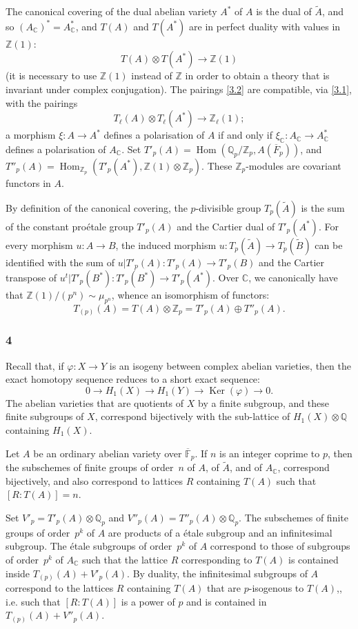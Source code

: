\documentclass{article}
\newcommand{\FF}{\mathbb{F}}
\newcommand{\ZZ}{\mathbb{Z}}
\newcommand{\QQ}{\mathbb{Q}}
\newcommand{\CC}{\mathbb{C}}
\DeclareMathOperator{\Hom}{Hom}
\DeclareMathOperator{\Ker}{Ker}
\newcommand{\oldpage}[1]{\marginpar{\footnotesize$\Big\vert$ \textit{p.~#1}}}
\begin{document}
The canonical covering of the dual abelian variety $A^*$ of $A$ is the dual of $\widetilde{A}$, and so $(A_\CC)^*=A_\CC^*$, and $T(A)$ and $T(A^*)$ are in perfect duality with values in $\ZZ(1)$:
\[
\label{3.2}
  T(A)\otimes T(A^*) \to \ZZ(1)
\tag{3.2}
\]
(it is necessary to use $\ZZ(1)$ instead of $\ZZ$ in order to obtain a theory that is invariant under complex conjugation).
The pairings \cref{3.2} are compatible, via \cref{3.1}, with the pairings
\[
  T_\ell(A)\otimes T_\ell(A^*) \to \ZZ_\ell(1);
\]
a morphism $\xi\colon A\to A^*$ defines a polarisation of $A$ if and only if $\xi_\CC\colon A_\CC\to A_\CC^*$ defines a polarisation of $A_\CC$.
Set $T'_p(A) = \Hom(\QQ_p/\ZZ_p,A(\overline{F}_p))$, and $T''_p(A) = \Hom_{\ZZ_p}(T'_p(A^*),\ZZ(1)\otimes\ZZ_p)$.
These $\ZZ_p$-modules are covariant functors in $A$.

By definition of the canonical covering, the $p$-divisible group $T_p(\widetilde{A})$ is the sum of the constant pro\'{e}tale group $T'_p(A)$ and the Cartier dual of $T'_p(A^*)$.
For every morphism $u\colon A\to B$, the induced morphism $u\colon T_p(\widetilde{A})\to T_p(\widetilde{B})$ can be identified with the sum of $u|T'_p(A)\colon T'_p(A)\to T'_p(B)$ and the Cartier transpose of $u^t|T'_p(B^*)\colon T'_p(B^*)\to T'_p(A^*)$.
Over $\CC$, we canonically have that $\ZZ(1)/(p^n)\sim\mu_{p^n}$, whence an isomorphism of functors:
\[
\label{3.3}
  T_{(p)}(A) = T(A)\otimes\ZZ_p = T'_p(A)\oplus T''_p(A).
\tag{3.3}
\]


\subsubsection*{4}
\label{4}
Recall that, if $\varphi\colon X\to Y$ is an isogeny between complex abelian varieties, then the exact homotopy sequence reduces to a short exact sequence:
\[
  0 \to H_1(X) \to H_1(Y) \to \Ker(\varphi) \to 0.
\]
\oldpage{240}
The abelian varieties that are quotients of $X$ by a finite subgroup, and these finite subgroups of $X$, correspond bijectively with the sub-lattice of $H_1(X)\otimes\QQ$ containing $H_1(X)$.

Let $A$ be an ordinary abelian variety over $\overline{\FF}_p$.
If $n$ is an integer coprime to $p$, then the subschemes of finite groups of order~$n$ of $A$, of $\widetilde{A}$, and of $A_\CC$, correspond bijectively, and also correspond to lattices $R$ containing $T(A)$ such that $[R:T(A)]=n$.

Set $V'_p=T'_p(A)\otimes\QQ_p$ and $V''_p(A)=T''_p(A)\otimes\QQ_p$.
The subschemes of finite groups of order~$p^k$ of $A$ are products of a \'{e}tale subgroup and an infinitesimal subgroup.
The \'{e}tale subgroups of order~$p^k$ of $A$ correspond to those of subgroups of order~$p^k$ of $A_\CC$ such that the lattice $R$ corresponding to $T(A)$ is contained inside $T_{(p)}(A)+V'_p(A)$.
By duality, the infinitesimal subgroups of $A$ correspond to the lattices $R$ containing $T(A)$ that are $p$-isogenous to $T(A)$,, i.e. such that $[R:T(A)]$ is a power of $p$ and is contained in $T_{(p)}(A)+V''_p(A)$.
\end{document}
